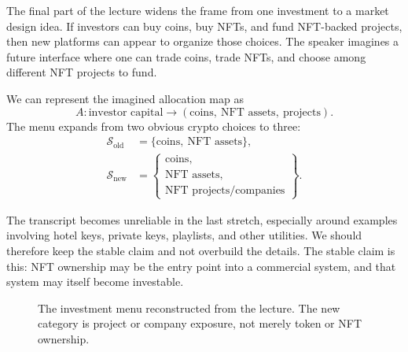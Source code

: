 The final part of the lecture widens the frame from one investment to a market design idea. If investors can buy coins, buy NFTs, and fund NFT-backed projects, then new platforms can appear to organize those choices. The speaker imagines a future interface where one can trade coins, trade NFTs, and choose among different NFT projects to fund.

We can represent the imagined allocation map as
\begin{equation}
A:
\text{investor capital}
\longrightarrow
(\text{coins},\ \text{NFT assets},\ \text{projects}).
\end{equation}
The menu expands from two obvious crypto choices to three:
\begin{align}
\mathcal{S}_{\mathrm{old}}
&=
\{\text{coins},\ \text{NFT assets}\}, \\
\mathcal{S}_{\mathrm{new}}
&=
\left\{
\begin{array}{l}
\text{coins}, \\
\text{NFT assets}, \\
\text{NFT projects/companies}
\end{array}
\right\}.
\end{align}

The transcript becomes unreliable in the last stretch, especially around examples involving hotel keys, private keys, playlists, and other utilities. We should therefore keep the stable claim and not overbuild the details. The stable claim is this: NFT ownership may be the entry point into a commercial system, and that system may itself become investable.

\begin{figure}
\centering
{}
\caption{The investment menu reconstructed from the lecture. The new category is project or company exposure, not merely token or NFT ownership.}
\end{figure}

